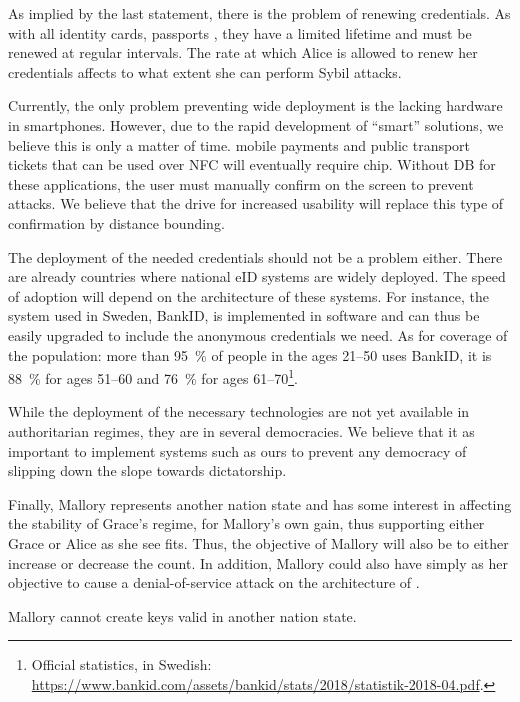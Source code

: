 As implied by the last statement, there is the problem of renewing credentials.
As with all identity cards, passports \etc, they have a limited lifetime and 
must be renewed at regular intervals.
The rate at which Alice is allowed to renew her credentials affects to what 
extent she can perform Sybil attacks.

Currently, the only problem preventing wide deployment is the lacking hardware 
in smartphones.
However, due to the rapid development of \enquote{smart} solutions, we believe 
this is only a matter of time.
\Eg mobile payments and public transport tickets that can be used over \ac{NFC} 
will eventually require  chip.
Without \ac{DB} for these applications, the user must manually confirm on the 
screen to prevent attacks.
We believe that the drive for increased usability will replace this type of 
confirmation by distance bounding.

The deployment of the needed credentials should not be a problem either.
There are already countries where national \ac{eID} systems are widely deployed.
The speed of adoption will depend on the architecture of these systems.
For instance, the system used in Sweden, BankID, is implemented in software and 
can thus be easily upgraded to include the anonymous credentials we need.
As for coverage of the population: more than \SI{95}{\%} of people in the ages 
21--50 uses BankID, it is \SI{88}{\%} for ages 51--60 and \SI{76}{\%} for ages 
61--70\footnote{%
  Official statistics, in Swedish:
  \url{https://www.bankid.com/assets/bankid/stats/2018/statistik-2018-04.pdf}.
}.

While the deployment of the necessary technologies are not yet available in 
authoritarian regimes, they are in several democracies.
We believe that it as important to implement systems such as ours to prevent any 
democracy of slipping down the slope towards dictatorship.

Finally, Mallory represents another nation state and has some interest in 
affecting the stability of Grace's regime, for Mallory's own gain, thus 
supporting either Grace or Alice as she see fits.
Thus, the objective of Mallory will also be to either increase or decrease the count.
In addition, Mallory could also have simply as her objective to cause a 
denial-of-service attack on the architecture of \PRIVO.

Mallory cannot create keys valid in another nation state.
